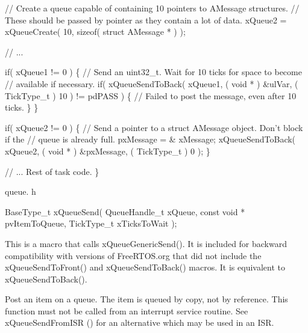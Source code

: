 \begin{DoxyPre}   // Create a queue capable of containing 10 pointers to AMessage structures.
   // These should be passed by pointer as they contain a lot of data.
   xQueue2 = xQueueCreate( 10, sizeof( struct AMessage * ) );\end{DoxyPre}



\begin{DoxyPre}   // ...\end{DoxyPre}



\begin{DoxyPre}   if( xQueue1 != 0 )
   \{
    // Send an uint32\_t.  Wait for 10 ticks for space to become
    // available if necessary.
    if( xQueueSendToBack( xQueue1, ( void * ) \&ulVar, ( TickType\_t ) 10 ) != pdPASS )
    \{
        // Failed to post the message, even after 10 ticks.
    \}
   \}\end{DoxyPre}



\begin{DoxyPre}   if( xQueue2 != 0 )
   \{
    // Send a pointer to a struct AMessage object.  Don't block if the
    // queue is already full.
    pxMessage = \& xMessage;
    xQueueSendToBack( xQueue2, ( void * ) \&pxMessage, ( TickType\_t ) 0 );
   \}\end{DoxyPre}



\begin{DoxyPre}   // ... Rest of task code.
\}
\end{DoxyPre}


queue. h 
\begin{DoxyPre}
BaseType\_t xQueueSend(
                          QueueHandle\_t xQueue,
                          const void * pvItemToQueue,
                          TickType\_t xTicksToWait
                     );
  \end{DoxyPre}


This is a macro that calls x\+Queue\+Generic\+Send(). It is included for backward compatibility with versions of Free\+R\+T\+O\+S.\+org that did not include the x\+Queue\+Send\+To\+Front() and x\+Queue\+Send\+To\+Back() macros. It is equivalent to x\+Queue\+Send\+To\+Back().

Post an item on a queue. The item is queued by copy, not by reference. This function must not be called from an interrupt service routine. See x\+Queue\+Send\+From\+I\+S\+R () for an alternative which may be used in an I\+S\+R.


